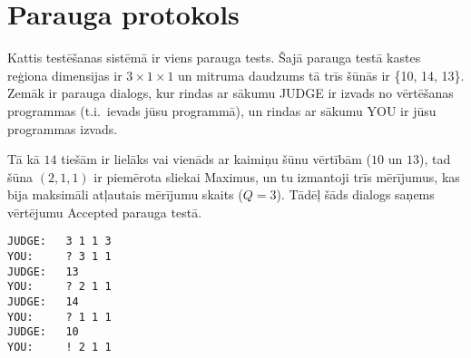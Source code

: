 \section*{Parauga protokols}
Kattis testēšanas sistēmā ir viens parauga tests.
Šajā parauga testā kastes reģiona dimensijas ir $3\times 1\times 1$ un mitruma daudzums tā trīs šūnās ir \{10, 14, 13\}.
Zemāk ir parauga dialogs, kur rindas ar sākumu JUDGE ir izvads no vērtēšanas programmas (t.i.\ ievads jūsu programmā), un rindas ar sākumu YOU ir jūsu programmas izvads.

Tā kā $14$ tiešām ir lielāks vai vienāds ar kaimiņu šūnu vērtībām ($10$ un $13$), tad šūna $(2,1,1)$ ir piemērota sliekai Maximus,
un tu izmantoji trīs mērījumus, kas bija maksimāli atļautais mērījumu skaits ($Q=3$). Tādēļ šāds dialogs saņems vērtējumu Accepted parauga testā.

\begin{verbatim}
JUDGE:   3 1 1 3
YOU:     ? 3 1 1
JUDGE:   13
YOU:     ? 2 1 1
JUDGE:   14
YOU:     ? 1 1 1
JUDGE:   10
YOU:     ! 2 1 1
\end{verbatim}
